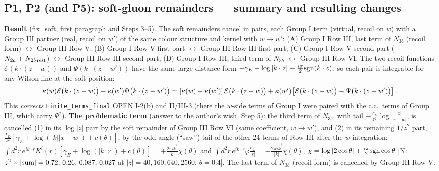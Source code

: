 \documentclass[10pt]{article}
\begin{document}
\subsection{P1, P2 (and P5): soft-gluon remainders --- summary and resulting changes}\label{sec:fix-soft}
\noindent\textbf{Result} (fix\_soft, first paragraph and Steps 3--5). The soft remainders cancel in pairs, each Group I term (virtual, recoil on $w$) with a Group III partner (real, recoil on $w'$) of the same colour structure and kernel with $w\to w'$: (A) Group I Row III, last term of $N_{3b}$ (recoil form) $\leftrightarrow$ Group III Row V; (B) Group I Row V first part $\leftrightarrow$ Group III Row III first part; (C) Group I Row V second part ($N_{2a}+N_{2b\,\rm rest}$) $\leftrightarrow$ Group III Row III second part; (D) Group I Row III, third term of $N_{3b}$ $\leftrightarrow$ Group III Row VI. The two recoil functions $\mathcal{E}(k\cdot(z-w))$ and $\Psi(k\cdot(z-w'))$ have the same large-distance form $-\gamma_{E}-\log|k\cdot z|-\frac{i\pi}{2}{\rm sgn}(k\cdot z)$, so each pair is integrable for any Wilson line at the soft position:
\begin{align}
\kappa(w)\mathcal{E}\big(k\cdot(z-w)\big)-\kappa(w')\Psi\big(k\cdot(z-w')\big)=[\kappa(w)-\kappa(w')]\,\mathcal{E}\big(k\cdot(z-w)\big)+\kappa(w')\big[\mathcal{E}\big(k\cdot(z-w)\big)-\Psi\big(k\cdot(z-w')\big)\big]\,.\notag
\end{align}
This \emph{corrects} \texttt{Finite\_terms\_final} OPEN I-2(b) and II/III-3 (there the $w$-side terms of Group I were paired with the c.c.\ terms of Group III, which carry $\Psi^{*}$). \textbf{The problematic term} (answer to the author's wish, Step 5): the third term of $N_{3b}$, with tail $-\frac{T_{D}}{z^{2}}\log\frac{|z|}{|x-w|}$, is cancelled (1) in its $\log|z|$ part by the soft remainder of Group III Row VI (same coefficient, $w\to w'$), and (2) in its remaining $1/z^{2}$ part, $\frac{T_{D}}{z^{2}}[\gamma_{E}+\log(|k||x-w|)+c(\theta)]$, by the odd-angle (``saw'') tail of the other 24 terms of Row III after the $w$ integration: $\int d^{2}r\,e^{ik\cdot r}K^{i}(r)[\gamma_{E}+\log(|k||r|)+c(\theta)]=+\frac{2\pi i\hat k^{i}}{|k|}\chi(\theta)$ and $\int d^{2}r\,e^{ik\cdot r}\varphi\frac{e_{\perp}^{i}}{|r|}=-\frac{2\pi i\hat k^{i}}{|k|}\chi(\theta)$, $\chi=\log|2\cos\theta|+\frac{i\pi}{2}{\rm sgn}\cos\theta$ [N: $z^{2}\times|{\rm sum}|=0.72,\,0.26,\,0.087,\,0.027$ at $|z|=40,160,640,2560$, $\theta=0.4$]. The last term of $N_{3b}$ (recoil form) is cancelled by Group III Row V.
\end{document}
